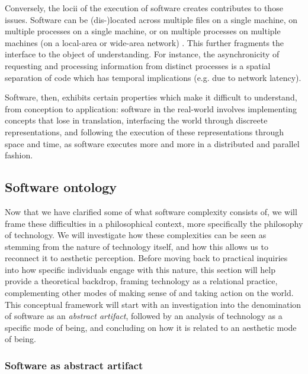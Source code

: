 Conversely, the locii of the execution of software creates contributes to those issues. Software can be (dis-)located across multiple files on a single machine, on multiple processes on a single machine, or on multiple processes on multiple machines (on a local-area or wide-area network) \citep{berry_philosophy_2011}. This further fragments the interface to the object of understanding. For instance, the asynchronicity of requesting and processing information from distinct processes is a spatial separation of code which has temporal implications (e.g. due to network latency).

\spacer

Software, then, exhibits certain properties which make it difficult to understand, from conception to application: software in the real-world involves implementing concepts that lose in translation, interfacing the world through discreete representations, and following the execution of these representations through space and time, as software executes more and more in a distributed and parallel fashion.

\subsection{Software ontology} %

Now that we have clarified some of what software complexity consists of, we will frame these difficulties in a philosophical context, more specifically the philosophy of technology. We will investigate how these complexities can be seen as stemming from the nature of technology itself, and how this allows us to reconnect it to aesthetic perception. Before moving back to practical inquiries into how specific individuals engage with this nature, this section will help provide a theoretical backdrop, framing technology as a relational practice, complementing other modes of making sense of and taking action on the world. This conceptual framework will start with an investigation into the denomination of software as an \emph{abstract artifact}, followed by an analysis of technology as a specific mode of being, and concluding on how it is related to an aesthetic mode of being.

\subsubsection{Software as abstract artifact}

